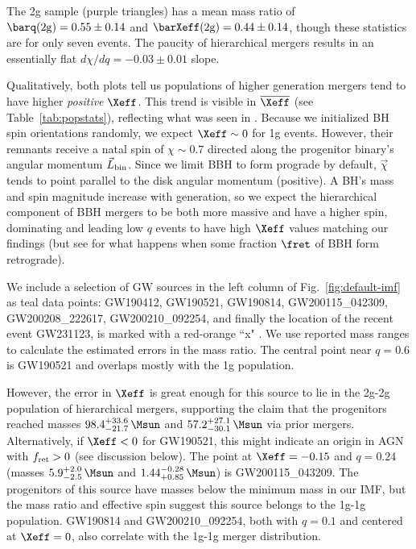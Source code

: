 The 2g sample (purple triangles) has a mean mass ratio of $\barq({\rm 2g})=0.55\pm0.14$ and $\barXeff({\rm 2g})=0.44\pm0.14$, though these statistics are for only seven events.
The paucity of hierarchical mergers results in an essentially flat $d\chi/dq=-0.03\pm0.01$ slope.

Qualitatively, both plots tell us populations of higher generation mergers tend to have higher \textit{positive} $\Xeff$.
This trend is visible in $\overline{\Xeff}$ (see Table~\ref{tab:popstats}), reflecting what was seen in \citet{Mckernan+22:q-Xeff}.
Because we initialized BH spin orientations randomly, we expect $\Xeff\sim0$ for 1g events.
However, their remnants receive a natal spin of $\chi \sim 0.7$ directed along the progenitor binary's angular momentum $\vec{L}_{\rm bin}$.
Since we limit BBH to form prograde by default, $\vec{\chi}$ tends to point parallel to the disk angular momentum (positive).
A BH's mass and spin magnitude increase with generation, so we expect the hierarchical component of BBH mergers to be both more massive and have a higher spin, dominating  and leading low $q$ events to have high $\Xeff$ values matching our findings (but see  for what happens when some fraction $\fret$ of BBH form retrograde).

We include a selection of GW sources in the left column of Fig.~\ref{fig:default-imf} as teal data points: GW190412, GW190521, GW190814, GW200115\_042309, GW200208\_222617, GW200210\_092254, 
and finally the location of the recent event  GW231123, is marked with a red-orange ``x"
\citep{Abbott+20-GW190521astro,Abbott+20-GW190521,Abbott+23-O3b,Abbot+24:GWTC-2.1,LVK+25-GW231123}.
We use reported mass ranges to calculate the estimated errors in the mass ratio.
The central point near $q=0.6$ is GW190521 and overlaps mostly with the 1g population.

However, the error in $\Xeff$ is great enough for this source to lie in the 2g-2g population of hierarchical mergers, supporting the claim that the progenitors reached masses $98.4_{-21.7}^{+33.6}\,\Msun$ and $57.2_{-30.1}^{+27.1}\,\Msun$ via prior mergers.
Alternatively, if $\Xeff<0$ for GW190521, this might indicate an origin in AGN with $f_{\rm ret}>0$ (see discussion below).
The point at $\Xeff=-0.15$ and $q=0.24$ (masses $5.9_{-2.5}^{+2.0}\,\Msun$ and $1.44_{+0.85}^{-0.28}\,\Msun$) is GW200115\_043209.
The progenitors of this source have masses below the minimum mass in our IMF, but the mass ratio and effective spin suggest this source belongs to the 1g-1g population.
GW190814 and GW200210\_092254, both with $q=0.1$ and centered at $\Xeff=0$, also correlate with the 1g-1g merger distribution.

